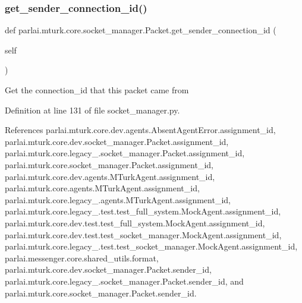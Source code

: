 \subsubsection{\texorpdfstring{get\+\_\+sender\+\_\+connection\+\_\+id()}{get\_sender\_connection\_id()}}
{\footnotesize\ttfamily def parlai.\+mturk.\+core.\+socket\+\_\+manager.\+Packet.\+get\+\_\+sender\+\_\+connection\+\_\+id (\begin{DoxyParamCaption}\item[{}]{self }\end{DoxyParamCaption})}

\begin{DoxyVerb}Get the connection_id that this packet came from\end{DoxyVerb}
 

Definition at line 131 of file socket\+\_\+manager.\+py.



References parlai.\+mturk.\+core.\+dev.\+agents.\+Absent\+Agent\+Error.\+assignment\+\_\+id, parlai.\+mturk.\+core.\+dev.\+socket\+\_\+manager.\+Packet.\+assignment\+\_\+id, parlai.\+mturk.\+core.\+legacy\+\_.\+socket\+\_\+manager.\+Packet.\+assignment\+\_\+id, parlai.\+mturk.\+core.\+socket\+\_\+manager.\+Packet.\+assignment\+\_\+id, parlai.\+mturk.\+core.\+dev.\+agents.\+M\+Turk\+Agent.\+assignment\+\_\+id, parlai.\+mturk.\+core.\+agents.\+M\+Turk\+Agent.\+assignment\+\_\+id, parlai.\+mturk.\+core.\+legacy\+\_.\+agents.\+M\+Turk\+Agent.\+assignment\+\_\+id, parlai.\+mturk.\+core.\+legacy\+\_.\+test.\+test\+\_\+full\+\_\+system.\+Mock\+Agent.\+assignment\+\_\+id, parlai.\+mturk.\+core.\+dev.\+test.\+test\+\_\+full\+\_\+system.\+Mock\+Agent.\+assignment\+\_\+id, parlai.\+mturk.\+core.\+dev.\+test.\+test\+\_\+socket\+\_\+manager.\+Mock\+Agent.\+assignment\+\_\+id, parlai.\+mturk.\+core.\+legacy\+\_.\+test.\+test\+\_\+socket\+\_\+manager.\+Mock\+Agent.\+assignment\+\_\+id, parlai.\+messenger.\+core.\+shared\+\_\+utils.\+format, parlai.\+mturk.\+core.\+dev.\+socket\+\_\+manager.\+Packet.\+sender\+\_\+id, parlai.\+mturk.\+core.\+legacy\+\_.\+socket\+\_\+manager.\+Packet.\+sender\+\_\+id, and parlai.\+mturk.\+core.\+socket\+\_\+manager.\+Packet.\+sender\+\_\+id.

\mbox{\label{classparlai_1_1mturk_1_1core_1_1socket__manager_1_1Packet_a308912fbfb5d9423d882100db5c79756}} 
